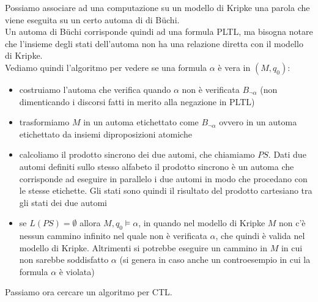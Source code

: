\documentclass[a4paper,12pt, oneside]{book}
\begin{document}
Possiamo associare ad una computazione su un modello di Kripke una parola che
viene eseguita su un certo automa di di B\"{u}chi.\\
Un automa di B\"{u}chi corrisponde quindi ad una formula PLTL, ma bisogna notare
che l'insieme degli stati dell'automa non ha una relazione diretta con il
modello di Kripke.\\
Vediamo quindi l'algoritmo per vedere se una formula $\alpha$ è vera in
$(M,q_0)$:
\begin{itemize}
  \item costruiamo l'automa che verifica quando $\alpha$ non è verificata
  $B_{\neg\alpha}$ (non dimenticando i discorsi fatti in merito alla negazione
  in PLTL)
  \item trasformiamo $M$ in un automa etichettato come $B_{\neg\alpha}$ ovvero
  in un automa etichettato da insiemi diproposizioni atomiche 
  \item calcoliamo il prodotto sincrono dei due automi, che chiamiamo $PS$. Dati
  due automi definiti sullo stesso alfabeto il prodotto sincrono è un automa che
  corrisponde ad eseguire in parallelo i due automi in modo che procedano con le
  stesse etichette. Gli stati sono quindi il risultato del prodotto cartesiano
  tra gli stati dei due automi
  \item se $L(PS)=\emptyset$ allora $M,q_0\vDash\alpha$, in quando nel modello
  di Kripke $M$ non c'è nessun cammino infinito nel quale non è verificata
  $\alpha$, che quindi è valida nel modello di Kripke. Altrimenti si potrebbe
  eseguire un cammino in $M$ in cui non sarebbe soddisfatto $\alpha$ (si genera
  in caso anche un controesempio in cui la formula $\alpha$ è violata)
\end{itemize}
Passiamo ora cercare un algoritmo per CTL.
\end{document}
